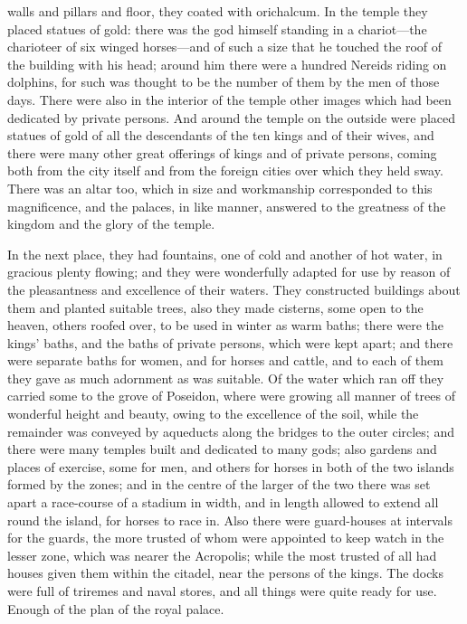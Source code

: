 \documentclass[11pt,letter]{article}
\begin{document}
walls and pillars and floor, they coated with orichalcum. In the temple they placed statues of gold: there was the god himself standing in a chariot—the charioteer of six winged horses—and of such a size that he touched the roof of the building with his head; around him there were a hundred Nereids riding on dolphins, for such was thought to be the number of them by the men of those days. There were also in the interior of the temple other images which had been dedicated by private persons. And around the temple on the outside were placed statues of gold of all the descendants of the ten kings and of their wives, and there were many other great offerings of kings and of private persons, coming both from the city itself and from the foreign cities over which they held sway. There was an altar too, which in size and workmanship corresponded to this magnificence, and the palaces, in like manner, answered to the greatness of the kingdom and the glory of the temple.

\par  In the next place, they had fountains, one of cold and another of hot water, in gracious plenty flowing; and they were wonderfully adapted for use by reason of the pleasantness and excellence of their waters. They constructed buildings about them and planted suitable trees, also they made cisterns, some open to the heaven, others roofed over, to be used in winter as warm baths; there were the kings' baths, and the baths of private persons, which were kept apart; and there were separate baths for women, and for horses and cattle, and to each of them they gave as much adornment as was suitable. Of the water which ran off they carried some to the grove of Poseidon, where were growing all manner of trees of wonderful height and beauty, owing to the excellence of the soil, while the remainder was conveyed by aqueducts along the bridges to the outer circles; and there were many temples built and dedicated to many gods; also gardens and places of exercise, some for men, and others for horses in both of the two islands formed by the zones; and in the centre of the larger of the two there was set apart a race-course of a stadium in width, and in length allowed to extend all round the island, for horses to race in. Also there were guard-houses at intervals for the guards, the more trusted of whom were appointed to keep watch in the lesser zone, which was nearer the Acropolis; while the most trusted of all had houses given them within the citadel, near the persons of the kings. The docks were full of triremes and naval stores, and all things were quite ready for use. Enough of the plan of the royal palace.
\end{document}
